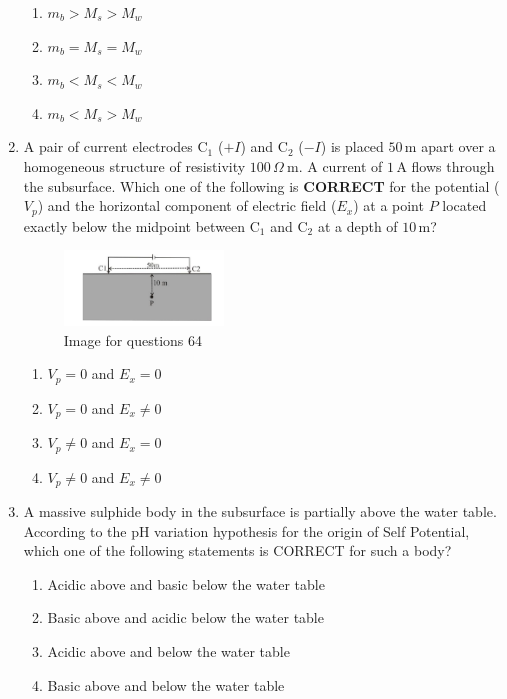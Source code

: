 \documentclass[journal,12pt,onecolumn]{IEEEtran}
\theoremstyle{remark}
\begin{document}
\begin{enumerate}
\begin{enumerate}
\item $m_b > M_s > M_w$
\item $m_b = M_s = M_w$
\item $m_b < M_s < M_w$
\item $m_b < M_s > M_w$
\end{enumerate}

\item A pair of current electrodes C$_1$ ($+I$) and C$_2$ ($-I$) is placed $50\,\mathrm{m}$ apart over a homogeneous structure of resistivity $100\,\Omega\ \mathrm{m}$. A current of $1\,\mathrm{A}$ flows through the subsurface. Which one of the following is \textbf{CORRECT} for the potential ($V_p$) and the horizontal component of electric field ($E_x$) at a point $P$ located exactly below the midpoint between C$_1$ and C$_2$ at a depth of $10\,\mathrm{m}$?

\begin{figure}[H]
    \centering
    \includegraphics[width=0.4\textwidth]{figs/fig5.png}
    \caption{Image for questions 64}
    \label{fig:question64}
\end{figure}

\begin{multicols}{2}
\begin{enumerate}
\item $V_p = 0$ and $E_x = 0$
\item $V_p = 0$ and $E_x \neq 0$
\item $V_p \neq 0$ and $E_x = 0$
\item $V_p \neq 0$ and $E_x \neq 0$
\end{enumerate}
\end{multicols}

\item A massive sulphide body in the subsurface is partially above the water table. According to the pH variation hypothesis for the origin of Self Potential, which one of the following statements is CORRECT for such a body?
\begin{enumerate}
\item Acidic above and basic below the water table
\item Basic above and acidic below the water table
\item Acidic above and below the water table
\item Basic above and below the water table
\end{enumerate}



\end{enumerate}
\end{document}
